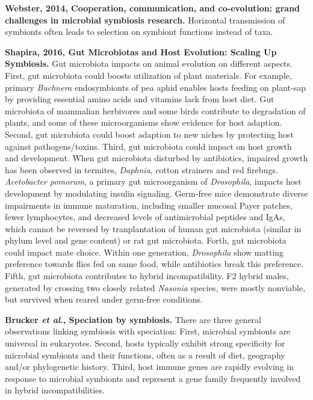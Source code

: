 \documentclass[11pt]{article}
\begin{document}
\begin{sloppypar}
\par
\textbf{Webster, 2014, Cooperation, communication, and co-evolution: grand challenges in microbial symbiosis research.} \newline
Horizontal transmission of symbionts often leads to selection on symbiont functions instead of taxa.
\par
\textbf{Shapira, 2016, Gut Microbiotas and Host Evolution: Scaling Up Symbiosis.} \newline
Gut microbiota impacts on animal evolution on different aspects. 
First, gut microbiota could boosts utilization of plant materials. 
For example, primary \textit{Buchnera} endosymbionts of pea aphid enables hosts feeding on plant-sap by providing essential amino acids and vitamins lack from host diet. 
Gut microbiota of mammalian herbivores and some birds contribute to degradation of plants, and some of these microorganisms show evidence for host adaption. 
Second, gut microbiota could boost adaption to new niches by protecting host against pathogens/toxins. 
Third, gut microbiota could impact on host growth and development. 
When gut microbiota disturbed by antibiotics, impaired growth has been observed in termites, \textit{Daphnia}, cotton strainers and red firebugs. 
\textit{Acetobacter pomorum}, a primary gut microorganism of \textit{Drosophila}, impacts host development by modulating insulin signaling. 
Germ-free mice demonstrate diverse impairments in immune maturation, including smaller mucosal Payer patches, fewer lymphocytes, and decreased levels of antimicrobial peptides and IgAs, which cannot be reversed by tranplantation of human gut microbiota (similar in phylum level and gene content) or rat gut microbiota. 
Forth, gut microbiota could impact mate choice. 
Within one generation, \textit{Drosophila} show matting preference towards flies fed on same food, while antibiotics break this preference. 
Fifth, gut microbiota contributes to hybrid incompatibility. 
F2 hybrid males, generated by crossing two closely related \textit{Nasonia} species, were mostly nonviable, but survived when reared under germ-free conditions. 
\par
\textbf{Brucker \textit{et al}., Speciation by symbiosis.} \newline
There are three general observations linking symbiosis with speciation: 
First, microbial symbionts are universal in eukaryotes. 
Second, hosts typically exhibit strong specificity for microbial symbionts and their functions, often as a result of diet, geography and/or phylogenetic history. 
Third, host immune genes are rapidly evolving in response to microbial symbionts and represent a gene family frequently involved in hybrid incompatibilities. 

\end{sloppypar}
\end{document}
